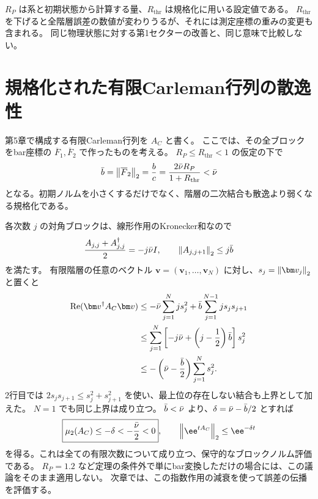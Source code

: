 \begin{warningbox}
$R_P$ は系と初期状態から計算する量、$R_{\mathrm{thr}}$ は規格化に用いる設定値である。
$R_{\mathrm{thr}}$ を下げると全階層誤差の数値が変わりうるが、それには測定座標の重みの変更も含まれる。
同じ物理状態に対する第1セクターの改善と、同じ意味で比較しない。
\end{warningbox}

\section{規格化された有限Carleman行列の散逸性}
第5章で構成する有限Carleman行列を $A_C$ と書く。
ここでは、その全ブロックをbar座標の $\overline F_1,\overline F_2$ で作ったものを考える。
$R_P\leq R_{\mathrm{thr}}<1$ の仮定の下で
\[
\bar b=\left\lVert \overline F_2\right\rVert_2=\frac bc
=\frac{2\bar\nu R_P}{1+R_{\mathrm{thr}}}<\bar\nu
\]
となる。初期ノルムを小さくするだけでなく、階層の二次結合も散逸より弱くなる規格化である。

各次数 $j$ の対角ブロックは、線形作用のKronecker和なので
\[
\frac{A_{j,j}+A_{j,j}^\dagger}{2}=-j\bar\nu I,
\qquad \left\lVert A_{j,j+1}\right\rVert_2\leq j\bar b
\]
を満たす。
有限階層の任意のベクトル $\bm v=(\bm v_1,\ldots,\bm v_N)$ に対し、$s_j=\normtwo{\bm v_j}$ と置くと
\begin{align*}
\operatorname{Re}(\bm v^\dagger A_C\bm v)
&\leq-\nuu\sum_{j=1}^{N}j s_j^2
+\bar b\sum_{j=1}^{N-1}j s_js_{j+1}\\
&\leq\sum_{j=1}^{N}\left[-j\nuu+\left(j-\frac12\right)\bar b\right]s_j^2\\
&\leq-\left(\nuu-\frac{\bar b}{2}\right)\sum_{j=1}^{N}s_j^2.
\end{align*}
2行目では $2s_js_{j+1}\leq s_j^2+s_{j+1}^2$ を使い、最上位の存在しない結合も上界として加えた。
$N=1$ でも同じ上界は成り立つ。
$\bar b<\bar\nu$ より、$\delta=\bar\nu-\bar b/2$ とすれば
\[
\boxed{\mu_2(A_C)\leq-\delta<-\frac{\nuu}{2}<0},
\qquad \normtwo{\ee^{tA_C}}\leq\ee^{-\delta t}
\]
を得る。これは全ての有限次数について成り立つ、保守的なブロックノルム評価である。
$R_P=1.2$ など定理の条件外で単にbar変換しただけの場合には、この議論をそのまま適用しない。
次章では、この指数作用の減衰を使って誤差の伝播を評価する。
\label{sec:finite-c-contractivity}

